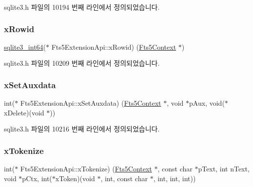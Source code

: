 sqlite3.\+h 파일의 10194 번째 라인에서 정의되었습니다.

\mbox{\label{struct_fts5_extension_api_acc4336c9f7bf39defa1acbdbf5df0020}} 
\subsubsection{\texorpdfstring{x\+Rowid}{xRowid}}
{\footnotesize\ttfamily \hyperlink{sqlite3_8h_a0a4d3e6c1ad46f90e746b920ab6ca0d2}{sqlite3\+\_\+int64}($\ast$ Fts5\+Extension\+Api\+::x\+Rowid) (\hyperlink{sqlite3_8h_a97821b95ebebd43db901977ffd5b26bc}{Fts5\+Context} $\ast$)}



sqlite3.\+h 파일의 10209 번째 라인에서 정의되었습니다.

\mbox{\label{struct_fts5_extension_api_a0f59a6c383a478ed95efdb7e4a95de80}} 
\subsubsection{\texorpdfstring{x\+Set\+Auxdata}{xSetAuxdata}}
{\footnotesize\ttfamily int($\ast$ Fts5\+Extension\+Api\+::x\+Set\+Auxdata) (\hyperlink{sqlite3_8h_a97821b95ebebd43db901977ffd5b26bc}{Fts5\+Context} $\ast$, void $\ast$p\+Aux, void($\ast$x\+Delete)(void $\ast$))}



sqlite3.\+h 파일의 10216 번째 라인에서 정의되었습니다.

\mbox{\label{struct_fts5_extension_api_a670af0d7715f69834376f8df187dcf30}} 
\subsubsection{\texorpdfstring{x\+Tokenize}{xTokenize}}
{\footnotesize\ttfamily int($\ast$ Fts5\+Extension\+Api\+::x\+Tokenize) (\hyperlink{sqlite3_8h_a97821b95ebebd43db901977ffd5b26bc}{Fts5\+Context} $\ast$, const char $\ast$p\+Text, int n\+Text, void $\ast$p\+Ctx, int($\ast$x\+Token)(void $\ast$, int, const char $\ast$, int, int, int))}



